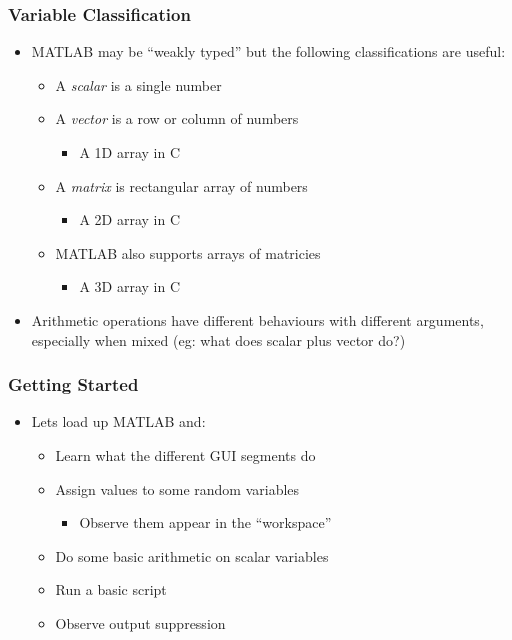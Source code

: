 \documentclass[14pt]{beamer}
\begin{document}
\begin{frame}
\frametitle{Variable Classification}
\begin{itemize}
\item MATLAB may be ``weakly typed'' but the following classifications are useful:
	\begin{itemize}
		\item A \textit{scalar} is a single number
		\item A \textit{vector} is a row or column of numbers 
		\begin{itemize}
			\item A 1D array in C
		\end{itemize}
		\item A \textit{matrix} is rectangular array of numbers
		\begin{itemize}
			\item A 2D array in C
		\end{itemize}
		\item MATLAB also supports arrays of matricies
		\begin{itemize}
			\item A 3D array in C
		\end{itemize}
	\end{itemize}
\pause
\item Arithmetic operations have different behaviours with different arguments, especially when mixed (eg: what does scalar plus vector do?)
\end{itemize}
\end{frame}

\begin{frame}
\frametitle{Getting Started}
\begin{itemize}
\item Lets load up MATLAB and:
	\begin{itemize}
		\item Learn what the different GUI segments do
		\item Assign values to some random variables
			\begin{itemize}
				\item Observe them appear in the ``workspace''
			\end{itemize}
		\item Do some basic arithmetic on scalar variables
		\item Run a basic script
		\item Observe output suppression
	\end{itemize}
\end{itemize}
\end{frame}
\end{document}
